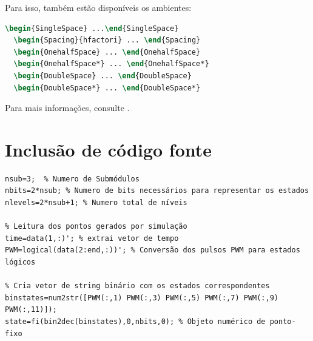 Para isso, também estão disponíveis os ambientes:

\begin{lstlisting}[language=tex]
  \begin{SingleSpace} ...\end{SingleSpace}
  \begin{Spacing}{hfactori} ... \end{Spacing}
  \begin{OnehalfSpace} ... \end{OnehalfSpace}
  \begin{OnehalfSpace*} ... \end{OnehalfSpace*}
  \begin{DoubleSpace} ... \end{DoubleSpace}
  \begin{DoubleSpace*} ... \end{DoubleSpace*}
\end{lstlisting}

Para mais informações, consulte \textcite[p. 47-52 e 135]{memoir}.

\section{Inclusão de código fonte}%
\label{sec-codeinsert}

\begin{lstlisting}[caption={[Leitura dos dados simulados e conversão para
estados topológicos.]{Leitura dos dados simulados e conversão para estados
topológicos. }},label={lst:leituradadossim}]
% Pré definições iniciais
nsub=3;  % Numero de Submódulos
nbits=2*nsub; % Numero de bits necessários para representar os estados
nlevels=2*nsub+1; % Numero total de níveis

% Leitura dos pontos gerados por simulação
time=data(1,:)'; % extrai vetor de tempo
PWM=logical(data(2:end,:))'; % Conversão dos pulsos PWM para estados lógicos

% Cria vetor de string binário com os estados correspondentes
binstates=num2str([PWM(:,1) PWM(:,3) PWM(:,5) PWM(:,7) PWM(:,9) PWM(:,11)]);
state=fi(bin2dec(binstates),0,nbits,0); % Objeto numérico de ponto-fixo

\end{lstlisting}

